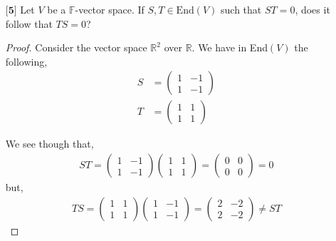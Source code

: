 \documentclass[12pt]{article}
\newcommand      {\Rm}         {{\mathbb R}}
\begin{document}
\begin{itemize}
\begin{proof}
        Therefore $T$ is invertible. 
    \end{proof}
    \vspace{.5cm}
    \item[$\textbf{[5]}$]
    Let $V$ be a $\mathbb{F}$-vector space. If $S,T \in \text{End}(V)$ such that $ST = 0$, does it follow that $TS = 0$?
    \begin{proof}
        Consider the vector space $\Rm^2$ over $\Rm$. We have in End$(V)$ the following,
        \begin{align*}
            S &= \begin{pmatrix}
                1 & -1 \\ 1 & -1
            \end{pmatrix} \\
            T &= \begin{pmatrix}
                1 & 1 \\ 1 & 1
            \end{pmatrix}
        \end{align*}

        We see though that,
        \begin{align*}
            ST = \begin{pmatrix}
                1 & -1 \\ 1 & -1
            \end{pmatrix}\begin{pmatrix}
                1 & 1 \\ 1 & 1
            \end{pmatrix} = \begin{pmatrix}
                0 & 0 \\ 0 & 0
            \end{pmatrix} = 0
        \end{align*}
        but,
        \begin{align*}
            TS = \begin{pmatrix}
                1 & 1 \\ 1 & 1
            \end{pmatrix}\begin{pmatrix}
                1 & -1 \\ 1 & -1
            \end{pmatrix} = \begin{pmatrix}
                2 & -2 \\ 2 & -2
            \end{pmatrix} \neq ST
        \end{align*}


\end{proof}
\end{itemize}
\end{document}
